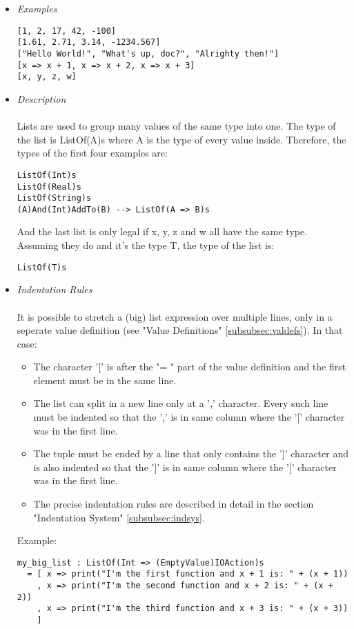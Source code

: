 \documentclass{article}
\begin{document}
\begin{itemize}

\item \textit{Examples}
\begin{verbatim}
[1, 2, 17, 42, -100]
[1.61, 2.71, 3.14, -1234.567]
["Hello World!", "What's up, doc?", "Alrighty then!"]
[x => x + 1, x => x + 2, x => x + 3]
[x, y, z, w]
\end{verbatim}

\item \textit{Description} \\\\
Lists are used to group many values of the same type into one. 
The type of the list is ListOf(A)s where A is the type of every value inside.
Therefore, the types of the first four examples are:
\begin{verbatim}
ListOf(Int)s
ListOf(Real)s
ListOf(String)s
(A)And(Int)AddTo(B) --> ListOf(A => B)s
\end{verbatim}
And the last list is only legal if x, y, z and w all have the same type. Assuming 
they do and it's the type T, the type of the list is: 
\begin{verbatim}
ListOf(T)s
\end{verbatim}

\item \textit{Indentation Rules} \\\\
It is possible to stretch a (big) list expression over multiple lines, only in a
seperate value definition (see "Value Definitions" \ref{subsubsec:valdefs}).
In that case:
\begin{itemize}
\item
The character '[' is after the "= " part of the value definition
and the first element must be in the same line.

\item
The list can split in a new line only at a ',' character. Every such line must
be indented so that the ',' is in same column where the '[' character was in
the first line.

\item
The tuple must be ended by a line that only contains the ']' character and is 
also indented so that the ']' is in same column where the '[' character was in
the first line.

\item
The precise indentation rules are described in detail in the section
"Indentation System" \ref{subsubsec:indsys}.
\end{itemize}
Example:
\begin{verbatim}
my_big_list : ListOf(Int => (EmptyValue)IOAction)s
  = [ x => print("I'm the first function and x + 1 is: " + (x + 1))
    , x => print("I'm the second function and x + 2 is: " + (x + 2))
    , x => print("I'm the third function and x + 3 is: " + (x + 3))
    ]
\end{verbatim}


\end{itemize}
\end{document}
